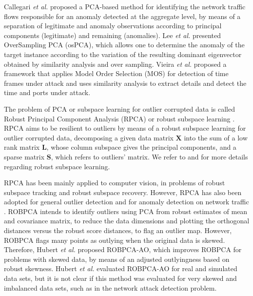 Callegari \emph{et al.} \cite{callegari2011novel} proposed a PCA-based method for identifying the network traffic flows responsible for an anomaly detected at the aggregate level, by means of a separation of legitimate and anomaly observations according to principal components (legitimate) and remaining (anomalies). Lee \emph{et al.} \cite{Lee2013} presented OverSampling PCA (osPCA), which allows one to determine the anomaly of the target instance according to the variation of the resulting dominant eigenvector obtained by similarity analysis and over sampling. Vieira \emph{et al.}  proposed a framework that applies Model Order Selection (MOS) for detection of time frames under attack and uses similarity analysis to extract details and detect the time and ports under attack.

The problem of PCA or subspace learning for outlier corrupted data is called Robust Principal Component Analysis (RPCA) or robust subspace learning \cite{candes2011robust, vaswani2018robust}. RPCA aims to be resilient to outliers by means of a robust subspace learning \cite{vaswani2018robust} for outlier corrupted data, decomposing a given data matrix $\pmb{X}$ into the sum of a low rank matrix $\pmb{L}$, whose column subspace gives the principal components, and a sparse matrix $\pmb{S}$, which refers to outliers’ matrix. We refer to \cite{lerman2018overview} and \cite{vaswani2018robust} for more details regarding robust subspace learning.

RPCA has been mainly applied to computer vision, in problems of robust subspace tracking and robust subspace recovery. However, RPCA has also been adopted for general outlier detection \cite{hubert2005robpca,hubert2009robustskewed,cherapanamjeri2017thresholding,zhou2017anomaly,NetflixSurus} and for anomaly detection on network traffic \cite{pascoal2012robust}. ROBPCA \cite{hubert2005robpca} intends to identify outliers using PCA from robust estimates of mean and covariance matrix, to reduce the data dimensions and plotting the orthogonal distances versus the robust score distances, to flag an outlier map. However, ROBPCA flags many points as outlying when the original data is skewed. Therefore, Hubert \emph{et al.} \cite{hubert2009robustskewed} proposed ROBPCA-AO, which improves ROBPCA for problems with skewed data, by means of an adjusted outlyingness based on robust skewness. Hubert \emph{et al.} \cite{hubert2009robustskewed} evaluated ROBPCA-AO for real and simulated data sets, but it is not clear if this method was evaluated for very skewed and imbalanced data sets, such as in the network attack detection problem.

